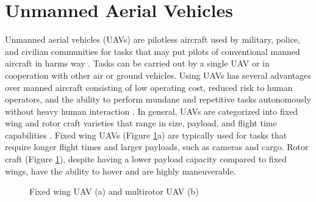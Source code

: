 \documentclass[numbered,pdftex]{ohio-etd}
\begin{document}
\section{Unmanned Aerial Vehicles}
Unmanned aerial vehicles (UAVs) are pilotless aircraft used by military, police, and civilian communities for tasks that may put pilots of conventional manned aircraft in harms way \cite{bone_uavs_2003}. Tasks can be carried out by a single UAV or in cooperation with other air \cite{oh_coordinated_2013,hyondong_oh_coordinated_2015,wise_uav_2006} or ground \cite{ulun_coordinated_2013} vehicles. Using UAVs has several advantages over manned aircraft consisting of low operating cost, reduced risk to human operators, and the ability to perform mundane and repetitive tasks autonomously without heavy human interaction \cite{austin2011unmanned}. In general, UAVs are categorized into fixed wing and rotor craft varieties that range in size, payload, and flight time capabilities \cite{beard_small_2012}. Fixed wing UAVs (Figure \ref{fig:fixedMultirotor}a) are typically used for tasks that require longer flight times and larger payloads, such as cameras and cargo. Rotor craft (Figure \ref{fig:fixedMultirotor}), despite having a lower payload capacity compared to fixed wings, have the ability to hover and are highly maneuverable.
\begin{figure}[H]
	\begin{subfigmatrix}{2}%
		\centering	
		\hspace*{0mm}
	\end{subfigmatrix}
	\caption{Fixed wing UAV (a) and multirotor UAV (b)}
	\label{fig:fixedMultirotor}
\end{figure}
\end{document}
